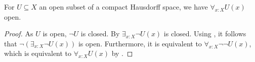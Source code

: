 

\begin{corollary}\label{AllOpenSubspaceOpen}
  For $U\subseteq X$ an open subset of a compact Hausdorff space, we have 
  $\forall_{x:X} U(x)$ open. 
\end{corollary}
\begin{proof}
  As $U$ is open, $\neg U$ is closed. 
  By  $\exists_{x:X} \neg U(x)$ is closed. 
  Using , it follows that 
  $\neg (\exists_{x:X} \neg U(x))$ is open. 
  Furthermore, it is equivalent to $\forall_{x:X} \neg \neg U(x)$, 
  which is equivalent to $\forall_{x:X} U(x)$ by .
\end{proof}

